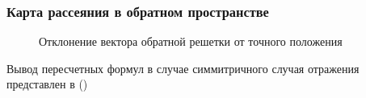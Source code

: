 \subsubsection{Карта рассеяния в обратном пространстве}

\begin{figure}[H]
  \centering
  \hfill
  \hfill
  \caption{Отклонение вектора обратной решетки от точного положения}
  \label{ris:}
\end{figure}



Вывод пересчетных формул в случае симмитричного случая отражения представлен в ()


\cite{Tanner_1998}
